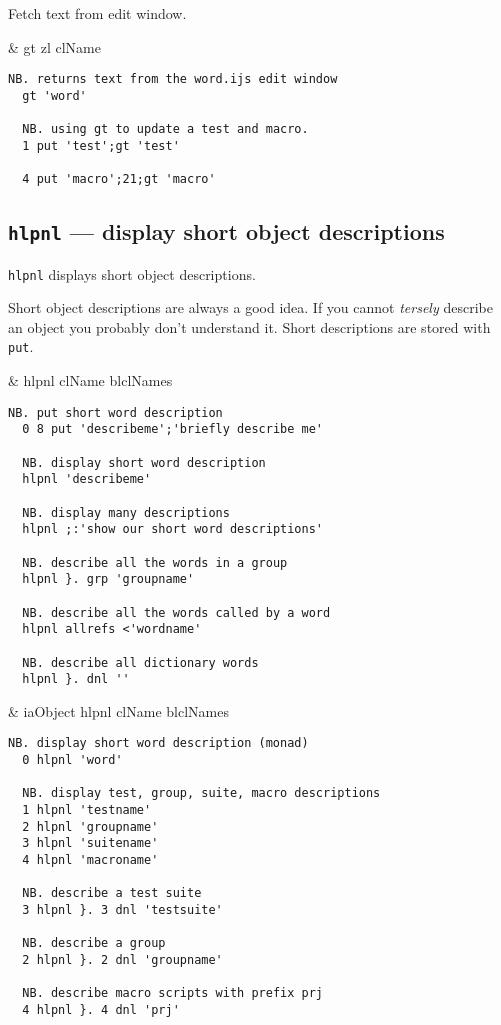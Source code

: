 Fetch text from edit window.

\begin{wordhead}
\monad & gt zl \argsep clName \\
\end{wordhead}
\begin{lstlisting}[frame=single,framerule=0pt] 
  NB. returns text from the word.ijs edit window
  gt 'word'  

  NB. using gt to update a test and macro.
  1 put 'test';gt 'test' 

  4 put 'macro';21;gt 'macro' 
\end{lstlisting}


\subsection{\texttt{hlpnl} --- display short object descriptions}

\texttt{hlpnl} displays short object descriptions.  

Short object descriptions are always a good idea.  
If you cannot \emph{tersely} describe an object you probably don't 
understand it.  Short descriptions 
are stored with \hypertarget{il:put}{\texttt{put}}.

\begin{wordhead}
\monad & hlpnl clName \argsep blclNames \\
\end{wordhead}
\begin{lstlisting}[frame=single,framerule=0pt] 
  NB. put short word description 
  0 8 put 'describeme';'briefly describe me' 

  NB. display short word description
  hlpnl 'describeme' 

  NB. display many descriptions
  hlpnl ;:'show our short word descriptions'

  NB. describe all the words in a group
  hlpnl }. grp 'groupname'

  NB. describe all the words called by a word
  hlpnl allrefs <'wordname'

  NB. describe all dictionary words
  hlpnl }. dnl ''
\end{lstlisting}

\begin{wordhead}
\dyad & iaObject hlpnl clName \argsep blclNames \\
\end{wordhead}
\begin{lstlisting}[frame=single,framerule=0pt] 
  NB. display short word description (monad)
  0 hlpnl 'word' 

  NB. display test, group, suite, macro descriptions
  1 hlpnl 'testname'
  2 hlpnl 'groupname'
  3 hlpnl 'suitename'
  4 hlpnl 'macroname'

  NB. describe a test suite
  3 hlpnl }. 3 dnl 'testsuite'

  NB. describe a group
  2 hlpnl }. 2 dnl 'groupname'

  NB. describe macro scripts with prefix prj
  4 hlpnl }. 4 dnl 'prj'
\end{lstlisting}


